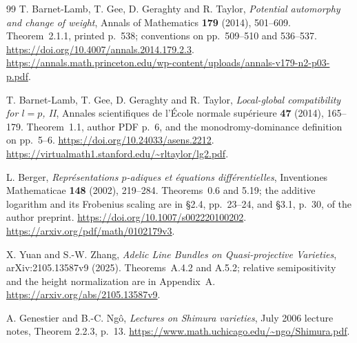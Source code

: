 \begin{thebibliography}{99}
T. Barnet-Lamb, T. Gee, D. Geraghty and R. Taylor,
\emph{Potential automorphy and change of weight},
Annals of Mathematics \textbf{179} (2014), 501--609.
Theorem~2.1.1, printed p.~538; conventions on pp.~509--510
and 536--537.
\url{https://doi.org/10.4007/annals.2014.179.2.3}.
\url{https://annals.math.princeton.edu/wp-content/uploads/annals-v179-n2-p03-p.pdf}.

T. Barnet-Lamb, T. Gee, D. Geraghty and R. Taylor,
\emph{Local-global compatibility for $l=p$, II},
Annales scientifiques de l'\'Ecole normale sup\'erieure
\textbf{47} (2014), 165--179.
Theorem~1.1, author PDF p.~6, and the monodromy-dominance
definition on pp.~5--6.
\url{https://doi.org/10.24033/asens.2212}.
\url{https://virtualmath1.stanford.edu/~rltaylor/lg2.pdf}.

L. Berger, \emph{Repr\'esentations $p$-adiques et
\'equations diff\'erentielles},
Inventiones Mathematicae \textbf{148} (2002), 219--284.
Theorems~0.6 and 5.19; the additive logarithm and its
Frobenius scaling are in \S2.4, pp.~23--24, and \S3.1,
p.~30, of the author preprint.
\url{https://doi.org/10.1007/s002220100202}.
\url{https://arxiv.org/pdf/math/0102179v3}.

X. Yuan and S.-W. Zhang,
\emph{Adelic Line Bundles on Quasi-projective Varieties},
arXiv:2105.13587v9 (2025).
Theorems~A.4.2 and A.5.2; relative semipositivity and the
height normalization are in Appendix~A.
\url{https://arxiv.org/abs/2105.13587v9}.

A. Genestier and B.-C. Ng\^o, \emph{Lectures on Shimura varieties},
July 2006 lecture notes, Theorem 2.2.3, p.\ 13.
\url{https://www.math.uchicago.edu/~ngo/Shimura.pdf}.


\end{thebibliography}
